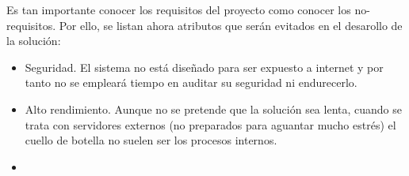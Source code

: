 Es tan importante conocer los requisitos del proyecto como conocer los no-requisitos. Por ello, se listan ahora atributos que serán evitados en el desarollo de la solución:

\begin{itemize}
    \item Seguridad. El sistema no está diseñado para ser expuesto a internet y por tanto no se empleará tiempo en auditar su seguridad ni endurecerlo.
    \item Alto rendimiento. Aunque no se pretende que la solución sea lenta, cuando se trata con servidores externos (no preparados para aguantar mucho estrés) el cuello de botella no suelen ser los procesos internos. 
    \item 
\end{itemize}